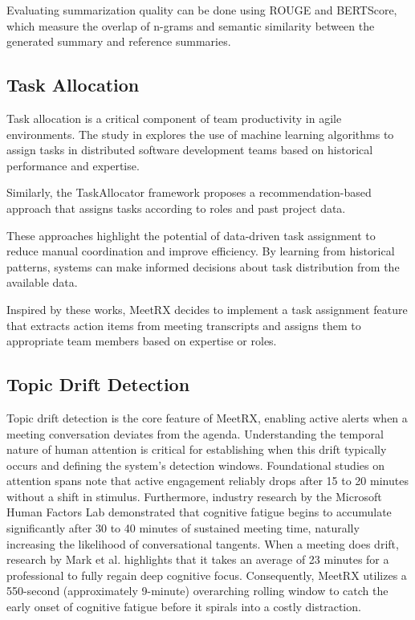 Evaluating summarization quality can be done using ROUGE\cite{rouge_eval} and BERTScore\cite{bertscore_eval}, which measure the overlap of n-grams and semantic similarity between the generated summary and reference summaries.

\subsection{Task Allocation}
\label{subsection:task-allocation}

Task allocation is a critical component of team productivity in agile environments. The study in\cite{task_allocation_ml} explores the use of machine learning algorithms to assign tasks in distributed software development teams based on historical performance and expertise.

Similarly, the TaskAllocator framework\cite{task_allocator} proposes a recommendation-based approach that assigns tasks according to roles and past project data.

These approaches highlight the potential of data-driven task assignment to reduce manual coordination and improve efficiency. By learning from historical patterns, systems can make informed decisions about task distribution from the available data.

Inspired by these works, MeetRX decides to implement a task assignment feature that extracts action items from meeting transcripts and assigns them to appropriate team members based on expertise or roles.

\subsection{Topic Drift Detection}
\label{subsection:topic-drift-detection}

Topic drift detection is the core feature of MeetRX, enabling active alerts when a meeting conversation deviates from the agenda. Understanding the temporal nature of human attention is critical for establishing when this drift typically occurs and defining the system's detection windows. Foundational studies on attention spans note that active engagement reliably drops after 15 to 20 minutes without a shift in stimulus\cite{bradbury2016attention}. Furthermore, industry research by the Microsoft Human Factors Lab\cite{mircrosoft2021brain} demonstrated that cognitive fatigue begins to accumulate significantly after 30 to 40 minutes of sustained meeting time, naturally increasing the likelihood of conversational tangents. When a meeting does drift, research by Mark et al.\cite{mark2008cost} highlights that it takes an average of 23 minutes for a professional to fully regain deep cognitive focus. Consequently, MeetRX utilizes a 550-second (approximately 9-minute) overarching rolling window to catch the early onset of cognitive fatigue before it spirals into a costly distraction.

